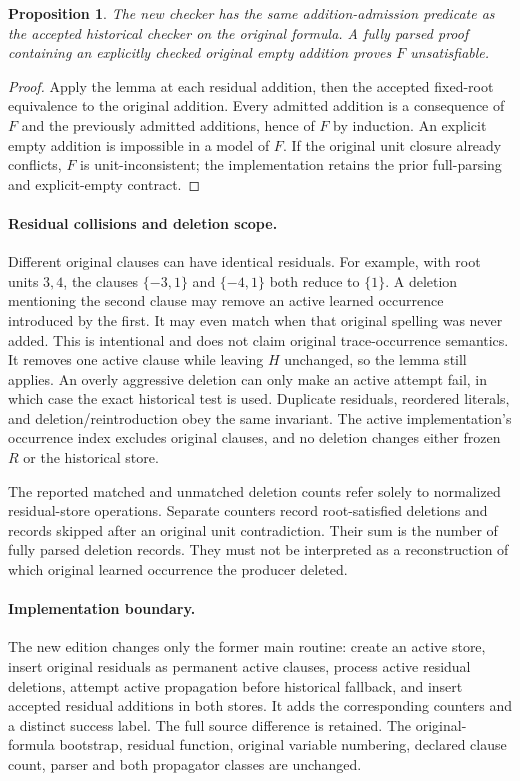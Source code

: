 \documentclass[11pt]{article}
\newtheorem{proposition}[lemma]{Proposition}
\begin{document}
\begin{proposition}
The new checker has the same addition-admission predicate as the accepted
historical checker on the original formula. A fully parsed proof containing
an explicitly checked original empty addition proves $F$ unsatisfiable.
\end{proposition}
\begin{proof}
Apply the lemma at each residual addition, then the accepted fixed-root
equivalence to the original addition. Every admitted addition is a consequence
of $F$ and the previously admitted additions, hence of $F$ by induction.
An explicit empty addition is impossible in a model of $F$.
If the original unit closure already conflicts, $F$ is unit-inconsistent;
the implementation retains the prior full-parsing and explicit-empty contract.
\end{proof}

\newpage
\paragraph{Residual collisions and deletion scope.}
Different original clauses can have identical residuals. For example, with
root units $3,4$, the clauses $\{-3,1\}$ and $\{-4,1\}$ both reduce to
$\{1\}$. A deletion mentioning the second clause may remove an active learned
occurrence introduced by the first. It may even match when that original
spelling was never added. This is intentional and does not claim original
trace-occurrence semantics. It removes one active clause while leaving $H$
unchanged, so the lemma still applies. An overly aggressive deletion can only
make an active attempt fail, in which case the exact historical test is used.
Duplicate residuals, reordered literals, and deletion/reintroduction obey the
same invariant. The active implementation's occurrence index excludes original
clauses, and no deletion changes either frozen $R$ or the historical store.

The reported matched and unmatched deletion counts refer solely to normalized
residual-store operations. Separate counters record root-satisfied deletions
and records skipped after an original unit contradiction. Their sum is the
number of fully parsed deletion records. They must not be interpreted as a
reconstruction of which original learned occurrence the producer deleted.

\paragraph{Implementation boundary.}
The new edition changes only the former main routine: create an active store,
insert original residuals as permanent active clauses, process active residual
deletions, attempt active propagation before historical fallback, and insert
accepted residual additions in both stores. It adds the corresponding counters
and a distinct success label. The full source difference is retained.
The original-formula bootstrap, residual function, original variable numbering,
declared clause count, parser and both propagator classes are unchanged.
\end{document}
